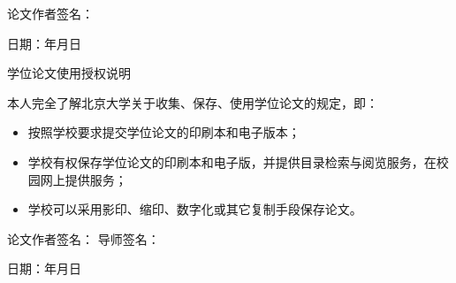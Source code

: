 \documentclass[UTF8,openany,a4paper]{ctexbook}
\theoremstyle{definition}
\begin{document}
\begin{flushright}
论文作者签名： \makebox[37mm]{}

日期：\qquad 年\qquad 月\qquad 日
\end{flushright}
\vspace{100pt}

\begin{center}
\rmfamily 学位论文使用授权说明
\end{center}

\bigskip

本人完全了解北京大学关于收集、保存、使用学位论文的规定，即：
\begin{itemize}
    \item 按照学校要求提交学位论文的印刷本和电子版本；
    \item 学校有权保存学位论文的印刷本和电子版，并提供目录检索与阅览服务，在校园网上提供服务；
    \item 学校可以采用影印、缩印、数字化或其它复制手段保存论文。
\end{itemize}
\bigskip
\begin{flushright}
    论文作者签名： \makebox[20mm]{}
    导师签名：\makebox[20mm]{}
        
    日期：\qquad 年\qquad 月\qquad 日
\end{flushright}
\end{document}
